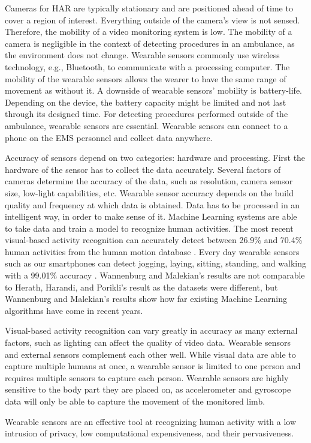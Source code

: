 \par Cameras for HAR are typically stationary and are positioned ahead of time to cover a region of interest. Everything outside of the camera’s view is not sensed. Therefore, the mobility of a video monitoring system is low. The mobility of a camera is negligible in the context of detecting procedures in an ambulance, as the environment does not change. Wearable sensors commonly use wireless technology, e.g., Bluetooth, to communicate with a processing computer. The mobility of the wearable sensors allows the wearer to have the same range of movement as without it. A downside of wearable sensors' mobility is battery-life. Depending on the device, the battery capacity might be limited and not last through its designed time. For detecting procedures performed outside of the ambulance, wearable sensors are essential. Wearable sensors can connect to a phone on the EMS personnel and collect data anywhere.
\par Accuracy of sensors depend on two categories: hardware and processing. First the hardware of the sensor has to collect the data accurately. Several factors of cameras determine the accuracy of the data, such as resolution, camera sensor size, low-light capabilities, etc. Wearable sensor accuracy depends on the build quality and frequency at which data is obtained. Data has to be processed in an intelligent way, in order to make sense of it. Machine Learning systems are able to take data and train a model to recognize human activities. The most recent visual-based activity recognition can accurately detect between 26.9\% and 70.4\% \cite{Herath2017} human activities from the human motion database \cite{Kuehne11}. Every day wearable sensors such as our smartphones can detect jogging, laying, sitting, standing, and walking with a 99.01\% accuracy \cite{Wannenburg2016}. Wannenburg and Malekian's \cite{Wannenburg2016} results are not comparable to Herath, Harandi, and Porikli's \cite{Herath2017} result as the datasets were different, but Wannenburg and Malekian’s results show how far existing Machine Learning algorithms have come in recent years.
\par Visual-based activity recognition can vary greatly in accuracy as many external factors, such as lighting can affect the quality of video data. Wearable sensors and external sensors complement each other well. While visual data are able to capture multiple humans at once, a wearable sensor is limited to one person and requires multiple sensors to capture each person. Wearable sensors are highly sensitive to the body part they are placed on, as accelerometer and gyroscope data will only be able to capture the movement of the monitored limb.
\par Wearable sensors are an effective tool at recognizing human activity with a low intrusion of privacy, low computational expensiveness, and their pervasiveness.

